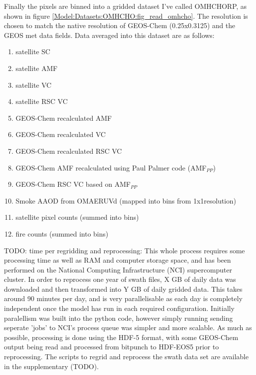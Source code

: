     Finally the pixels are binned into a gridded dataset I've called OMHCHORP, as shown in figure \ref{Model:Datasets:OMHCHO:fig_read_omhcho}.
    The resolution is chosen to match the native resolution of GEOS-Chem (0.25x0.3125\degr) and the GEOS met data fields.
    Data averaged into this dataset are as follows:
    \begin{enumerate}
      \item satellite SC %
      \item satellite AMF %
      \item satellite VC %
      \item satellite RSC VC %
      \item GEOS-Chem recalculated AMF %
      \item GEOS-Chem recalculated VC %
      \item GEOS-Chem recalculated RSC VC %
      \item GEOS-Chem AMF recalculated using Paul Palmer code (AMF$_{PP}$)
      \item GEOS-Chem RSC VC based on AMF$_{PP}$
      \item Smoke AAOD from OMAERUVd (mapped into bins from 1x1\degr resolution)
      \item satellite pixel counts (summed into bins)
      \item fire counts (summed into bins)
    \end{enumerate}
    
    TODO: time per regridding and reprocessing:
    This whole process requires some processing time as well as RAM and computer storage space, and has been performed on the National Computing Infrastructure (NCI) supercomputer cluster.
    In order to reprocess one year of swath files, X GB of daily data was downloaded and then transformed into Y GB of daily gridded data.
    This takes around 90 minutes per day, and is very parallelisable as each day is completely independent once the model has run in each required configuration.
    Initially paralellism was built into the python code, however simply running sending seperate 'jobs' to NCI's process queue was simpler and more scalable.
    As much as possible, processing is done using the HDF-5 format, with some GEOS-Chem output being read and processed from bitpunch to HDF-EOS5 prior to reprocessing.
    The scripts to regrid and reprocess the swath data set are available in the supplementary (TODO).
  
